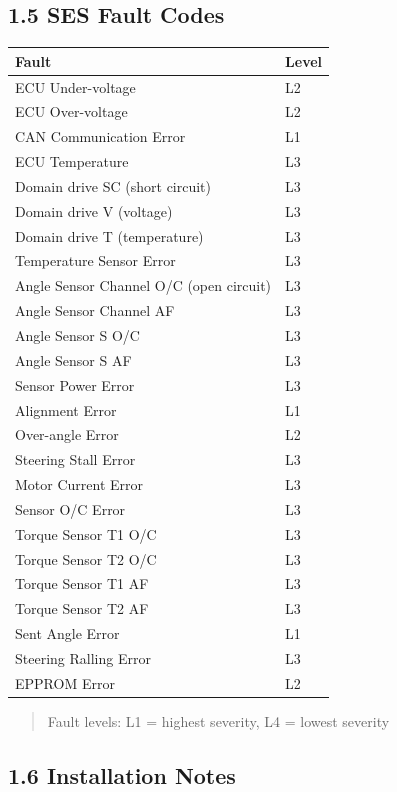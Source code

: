 \documentclass[12pt,a4paper,oneside]{report}
\begin{document}
\subsection{1.5 SES Fault Codes}\label{SES-fault-codes}

\begin{longtable}[]{@{}ll@{}}
\toprule\noalign{}
Fault & Level \\
\midrule\noalign{}
\endhead
\bottomrule\noalign{}
\endlastfoot
ECU Under-voltage & L2 \\
ECU Over-voltage & L2 \\
CAN Communication Error & L1 \\
ECU Temperature & L3 \\
Domain drive SC (short circuit) & L3 \\
Domain drive V (voltage) & L3 \\
Domain drive T (temperature) & L3 \\
Temperature Sensor Error & L3 \\
Angle Sensor Channel O/C (open circuit) & L3 \\
Angle Sensor Channel AF & L3 \\
Angle Sensor S O/C & L3 \\
Angle Sensor S AF & L3 \\
Sensor Power Error & L3 \\
Alignment Error & L1 \\
Over-angle Error & L2 \\
Steering Stall Error & L3 \\
Motor Current Error & L3 \\
Sensor O/C Error & L3 \\
Torque Sensor T1 O/C & L3 \\
Torque Sensor T2 O/C & L3 \\
Torque Sensor T1 AF & L3 \\
Torque Sensor T2 AF & L3 \\
Sent Angle Error & L1 \\
Steering Ralling Error & L3 \\
EPPROM Error & L2 \\
\end{longtable}

\begin{quote}
Fault levels: L1 = highest severity, L4 = lowest severity
\end{quote}

\subsection{1.6 Installation Notes}\label{installation-notes}
\end{document}
